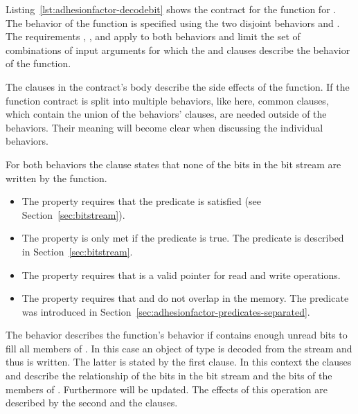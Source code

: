 Listing~\ref{lst:adhesionfactor-decodebit} shows the contract
for the  function for .
The behavior of the function is specified using the
two disjoint behaviors  and .
The requirements , ,
 and  apply to both behaviors
and limit the set of combinations of input arguments for which the
 and  clauses describe the behavior
of the function.

The  clauses in the contract's body describe the
side effects of the function.
If the function contract is split into multiple behaviors,
like here, common  clauses, which contain the union
of the behaviors'  clauses, are needed outside
of the behaviors.
Their meaning will become clear when discussing the
individual  behaviors.

For both behaviors the  clause states that
none of the bits in the bit stream are written by the function.

\begin{itemize}
\item
The property  requires that the predicate 
is satisfied (see Section~\ref{sec:bitstream}).

\item
The property  is only met if the  predicate is true.
The predicate  is described in
Section~\ref{sec:bitstream}.

\item
The property  requires that  is a valid pointer for read and write operations.

\item
The property  requires that  and  do not overlap in the memory.
The 
predicate was introduced in
Section~\ref{sec:adhesionfactor-predicates-separated}.
\end{itemize}



The behavior  describes the function's behavior if
 contains enough unread bits to fill
all members of . 
In this case an object of type 
is decoded from the stream
and thus  is written.
The latter is stated by the first  clause.
In this context the  clauses  and 
describe the relationship of the bits in the bit stream and
the bits of the members of .
Furthermore  will be updated.
The effects of this operation are described by the second
 and the  clauses.

